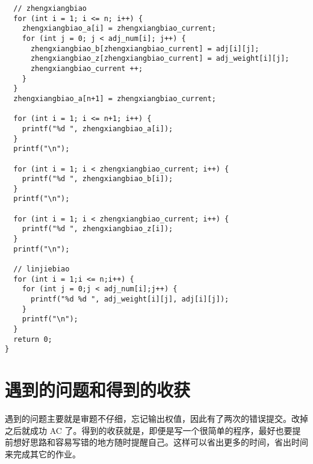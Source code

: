 \documentclass[11pt]{article}
\begin{document}
\begin{verbatim}
  // zhengxiangbiao
  for (int i = 1; i <= n; i++) {
    zhengxiangbiao_a[i] = zhengxiangbiao_current;
    for (int j = 0; j < adj_num[i]; j++) {
      zhengxiangbiao_b[zhengxiangbiao_current] = adj[i][j];
      zhengxiangbiao_z[zhengxiangbiao_current] = adj_weight[i][j];
      zhengxiangbiao_current ++;
    }
  }
  zhengxiangbiao_a[n+1] = zhengxiangbiao_current;

  for (int i = 1; i <= n+1; i++) {
    printf("%d ", zhengxiangbiao_a[i]);
  }
  printf("\n");

  for (int i = 1; i < zhengxiangbiao_current; i++) {
    printf("%d ", zhengxiangbiao_b[i]);
  }
  printf("\n");

  for (int i = 1; i < zhengxiangbiao_current; i++) {
    printf("%d ", zhengxiangbiao_z[i]);
  }
  printf("\n");

  // linjiebiao
  for (int i = 1;i <= n;i++) {
    for (int j = 0;j < adj_num[i];j++) {
      printf("%d %d ", adj_weight[i][j], adj[i][j]);
    }
    printf("\n");
  }
  return 0;
}

\end{verbatim}

\section{遇到的问题和得到的收获}
\label{sec:org4734df3}
遇到的问题主要就是审题不仔细，忘记输出权值，因此有了两次的错误提交。改掉之后就成功 AC 了。得到的收获就是，即便是写一个很简单的程序，最好也要提前想好思路和容易写错的地方随时提醒自己。这样可以省出更多的时间，省出时间来完成其它的作业。
\end{document}
